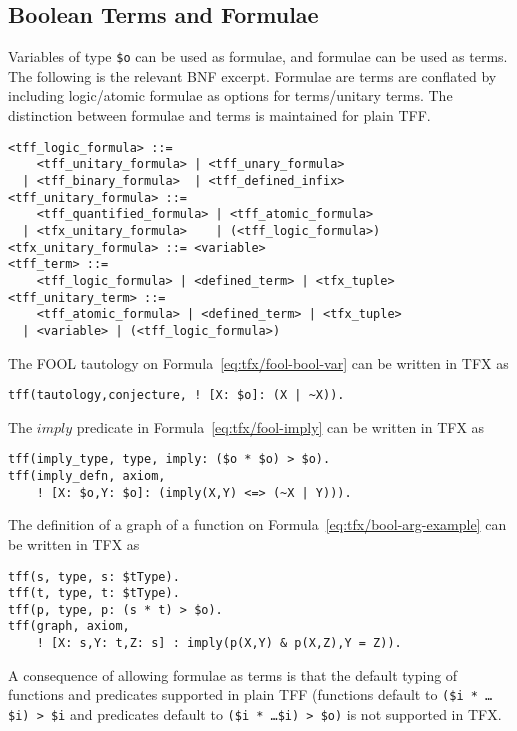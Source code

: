 \subsection{Boolean Terms and Formulae}

Variables of type \lstinline'$o' can be used as formulae, and formulae can be 
used as terms. 
The following is the relevant BNF excerpt.
Formulae are terms are conflated by including logic/atomic formulae as
options for terms/unitary terms.
The distinction between formulae and terms is maintained for plain TFF.
\begin{lstlisting}[language=bnf]
<tff_logic_formula> ::=
    <tff_unitary_formula> | <tff_unary_formula>
  | <tff_binary_formula>  | <tff_defined_infix>
<tff_unitary_formula> ::=
    <tff_quantified_formula> | <tff_atomic_formula>
  | <tfx_unitary_formula>    | (<tff_logic_formula>)
<tfx_unitary_formula> ::= <variable>
<tff_term> ::=
    <tff_logic_formula> | <defined_term> | <tfx_tuple>
<tff_unitary_term> ::=
    <tff_atomic_formula> | <defined_term> | <tfx_tuple>
  | <variable> | (<tff_logic_formula>)
\end{lstlisting}

The FOOL tautology on Formula~\ref{eq:tfx/fool-bool-var} can be written in TFX as
\begin{lstlisting}[language=tptp]
tff(tautology,conjecture, ! [X: $o]: (X | ~X)).
\end{lstlisting}

The $\mathit{imply}$ predicate in Formula~\ref{eq:tfx/fool-imply} can 
be written in TFX as
\begin{lstlisting}[language=tptp]
tff(imply_type, type, imply: ($o * $o) > $o).
tff(imply_defn, axiom,
    ! [X: $o,Y: $o]: (imply(X,Y) <=> (~X | Y))).
\end{lstlisting}


The definition of a graph of a function on Formula~\ref{eq:tfx/bool-arg-example} can be written in TFX as
\begin{lstlisting}[language=tptp]
tff(s, type, s: $tType).
tff(t, type, t: $tType).
tff(p, type, p: (s * t) > $o).
tff(graph, axiom,
    ! [X: s,Y: t,Z: s] : imply(p(X,Y) & p(X,Z),Y = Z)).
\end{lstlisting}

A consequence of allowing formulae as terms is that the default typing of 
functions and predicates supported in plain TFF (functions default to 
{\tt (\$i * \ldots * \$i) > \$i} and predicates default to 
{\tt (\$i * \ldots * \$i) > \$o)} is not supported in TFX.

